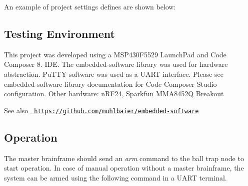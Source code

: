 An example of project settings defines are shown below\+: 
\begin{DoxyCode}{0}
\DoxyCodeLine{\textcolor{preprocessor}{\#define FCPU 24000000}}
\DoxyCodeLine{\textcolor{preprocessor}{\#define USE\_MODULE\_TASK}}
\DoxyCodeLine{\textcolor{preprocessor}{\#define USE\_MODULE\_TIMING}}
\DoxyCodeLine{\textcolor{preprocessor}{\#define USE\_MODULE\_LIST}}
\DoxyCodeLine{\textcolor{preprocessor}{\#define USE\_MODULE\_BUFFER}}
\DoxyCodeLine{\textcolor{preprocessor}{\#define USE\_MODULE\_BUFFER\_PRINTF}}
\DoxyCodeLine{\textcolor{preprocessor}{\#define USE\_MODULE\_UART}}
\DoxyCodeLine{\textcolor{preprocessor}{\#define USE\_MODULE\_SUBSYSTEM}}
\DoxyCodeLine{\textcolor{preprocessor}{\#define USE\_UART1}}
\DoxyCodeLine{\textcolor{preprocessor}{\#define SUBSYSTEM\_IO SUBSYSTEM\_IO\_UART}}
\DoxyCodeLine{\textcolor{preprocessor}{\#define SUBSYSTEM\_UART 1}}
\DoxyCodeLine{\textcolor{preprocessor}{\#define SUBSYS\_UART 1}}
\DoxyCodeLine{\textcolor{preprocessor}{\#define UART1\_TX\_BUFFER\_LENGTH 512}}
\DoxyCodeLine{\textcolor{preprocessor}{\#define TASK\_MAX\_LENGTH 50}}
\DoxyCodeLine{\textcolor{preprocessor}{\#define USE\_I2C0}}
\DoxyCodeLine{\textcolor{preprocessor}{\#define I2C\_MAX\_TX\_SIZE 2}}
\DoxyCodeLine{\textcolor{preprocessor}{\#define I2C\_MAX\_RX\_SIZE 6}}
\DoxyCodeLine{\textcolor{preprocessor}{\#define USE\_SPI\_B1}}
\DoxyCodeLine{\textcolor{preprocessor}{\#define SPI\_MAX\_SIZE 33}}
\DoxyCodeLine{\textcolor{preprocessor}{\#define THIEF\_SPI SPI\_B0}}
\DoxyCodeLine{\textcolor{preprocessor}{\#define THIEF\_BRAINFRAME\_NETWORK}}
\DoxyCodeLine{\textcolor{preprocessor}{\#define THIS\_NODE BALL\_TRAP}}
\end{DoxyCode}
\hypertarget{index_testing_environment}{}\subsection{Testing Environment}\label{index_testing_environment}
This project was developed using a M\+S\+P430\+F5529 Launch\+Pad and Code Composer 8. I\+DE. The embedded-\/software library was used for hardware abstraction. Pu\+T\+TY software was used as a U\+A\+RT interface. Please see embedded-\/software library documentation for Code Composer Studio configuration. Other hardware\+: n\+R\+F24, Sparkfun M\+M\+A8452Q Breakout \begin{DoxySeeAlso}{See also}
\href{https://github.com/muhlbaier/embedded-software}{\texttt{ https\+://github.\+com/muhlbaier/embedded-\/software}}
\end{DoxySeeAlso}
\hypertarget{index_operation}{}\subsection{Operation}\label{index_operation}
The master brainframe should send an {\itshape arm} command to the ball trap node to start operation. In case of manual operation without a master brainframe, the system can be armed using the following command in a U\+A\+RT terminal. 
\begin{DoxyCode}{0}
\end{DoxyCode}


